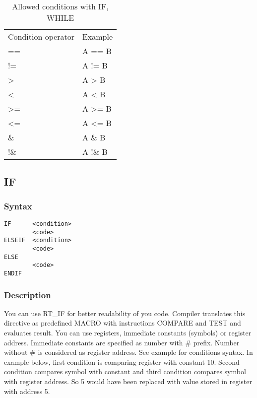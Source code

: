     \begin{table}[h!]
        \mysmallfont{}
        \centering{}
        \begin{tabular}{|l|l}
        \hline
        Condition operator       &          Example  \\
        ==                       &          A ==  B  \\
        !=                       &          A !=  B  \\
        >                        &          A >   B  \\
        <                        &          A <   B  \\
        >=                       &          A >=  B  \\
        <=                       &          A <=  B  \\
        \&                       &          A \&  B  \\
        !\&                      &          A !\& B
        \end{tabular}
        \caption{Allowed conditions with IF, WHILE}
    \end{table}

    \subsection{IF}
        \subsubsection{Syntax}
            \verb'IF      <condition>'\\
            \verb'        <code>'\\
            \verb'ELSEIF  <condition>'\\
            \verb'        <code>'\\
            \verb'ELSE'\\
            \verb'        <code>'\\
            \verb'ENDIF'

        \subsubsection{Description}
            You can use RT\_IF for better readability of you code. Compiler translates this directive as predefined MACRO with instructions COMPARE and TEST and evaluates result. You can use registers, immediate constants (symbols) or register address. Immediate constants are specified as number with \# prefix. Number without \# is considered as register address. See example for conditions syntax. In example below, first condition is comparing register with constant 10. Second condition compares symbol with constant and third condition compares symbol with register address. So 5 would have been replaced with value stored in register with address 5.

